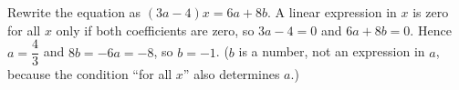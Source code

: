 Rewrite the equation as $(3a-4)x=6a+8b$. A linear expression in $x$ is zero for all $x$ only if both coefficients are zero, so $3a-4=0$ and $6a+8b=0$. Hence $a=\dfrac{4}{3}$ and $8b=-6a=-8$, so $\boxed{b=-1}$. ($b$ is a number, not an expression in $a$, because the condition ``for all $x$'' also determines $a$.)
